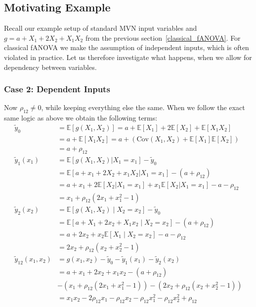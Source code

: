 \subsection*{Motivating Example}
Recall our example setup of standard MVN input variables and \(g = a + X_1 + 2X_2 + X_1 X_2\) from the previous section~\ref{classical_fANOVA}.
For classical fANOVA we make the assumption of independent inputs, which is often violated in practice. Let us therefore investigate what happens, when we allow for dependency between variables.

\subsubsection*{Case 2: Dependent Inputs}
Now $\rho_{12} \neq 0$, while keeping everything else the same. When we follow the exact same logic as above we obtain the following terms:
\begin{align*}
\tilde{y}_0 &= \mathbb{E}[g(X_1, X_2)] 
= a + \mathbb{E}[X_1] + 2\mathbb{E}[X_2] + \mathbb{E}[X_1 X_2] \\
&= a + \mathbb{E}[X_1 X_2] 
= a + \left( \text{Cov}(X_1, X_2) + \mathbb{E}[X_1]\mathbb{E}[X_2] \right) \\
&= a + \rho_{12} \\
\tilde{y}_1(x_1) 
&= \mathbb{E}[g(X_1, X_2) | X_1 = x_1] - \tilde{y}_0 \\
&= \mathbb{E}[a + x_1 + 2X_2 + x_1 X_2 | X_1 = x_1] - (a + \rho_{12}) \\
&= a + x_1 + 2\mathbb{E}[X_2 | X_1 = x_1] + x_1 \mathbb{E}[X_2 | X_1 = x_1] - a - \rho_{12} \\
&= x_1 + \rho_{12}(2x_1 + x_1^2 - 1) \\
\tilde{y}_2(x_2) 
&= \mathbb{E}[g(X_1, X_2) \mid X_2 = x_2] - \tilde{y}_0 \\
&= \mathbb{E}[a + X_1 + 2x_2 + X_1 x_2 \mid X_2 = x_2] - (a + \rho_{12}) \\
&= a + 2x_2 + x_2 \mathbb{E}[X_1 \mid X_2 = x_2] - a - \rho_{12} \\
&= 2x_2 + \rho_{12}(x_2 + x_2^2 - 1) \\
\tilde{y}_{12}(x_1, x_2) 
&= g(x_1, x_2) - \tilde{y}_0 - \tilde{y}_1(x_1) - \tilde{y}_2(x_2) \\
&= a + x_1 + 2x_2 + x_1 x_2 - (a + \rho_{12}) \\
&- (x_1 + \rho_{12}(2x_1 + x_1^2 - 1)) - (2x_2 + \rho_{12}(x_2 + x_2^2 - 1)) \\
&= x_1 x_2 - 2\rho_{12} x_1 - \rho_{12} x_2  - \rho_{12} x_1^2  - \rho_{12} x_2^2 + \rho_{12}
\end{align*}

